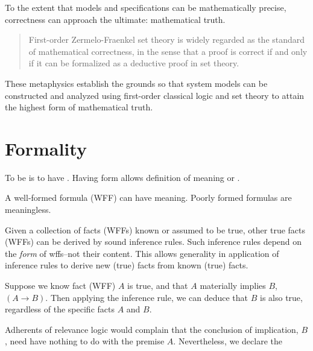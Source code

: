 \pn To the extent that models and specifications can be mathematically precise, correctness can approach the ultimate:  mathematical truth.

\begin{quotation}
First-order Zermelo-Fraenkel set theory is widely regarded as the standard of mathematical correctness, in the sense that a proof is correct if and only if it can be formalized as a deductive proof in set theory.\cite{tarski-truth}
\end{quotation}

\pn These metaphysics establish the grounds so that system models can be constructed and analyzed using first-order classical logic and set theory to attain the highest form of mathematical truth.

\section{Formality}\label{sec:formality}



\pn To be  is to have .  Having form allows definition of meaning or .


\pn A well-formed formula (WFF) can have meaning.  Poorly formed formulas are meaningless.  

\pn Given a collection of facts (WFFs) known or assumed to be true, other true facts (WFFs) can be derived by sound inference rules.  Such inference rules depend on the \emph{form} of wffs--not their content.
This allows generality in application of inference rules to derive new (true) facts from known (true) facts.


\pn Suppose we know fact (WFF) $A$ is true, and that $A$ materially implies $B$, $(A\rightarrow B)$.  Then applying the  inference rule, we can deduce that $B$ is also true, regardless of the specific facts $A$ and $B$.


\pn Adherents of relevance logic \cite{sep-logic-relevance} would complain that the conclusion of implication, $B$, need have nothing to do with the premise $A$.  Nevertheless, we declare the 

